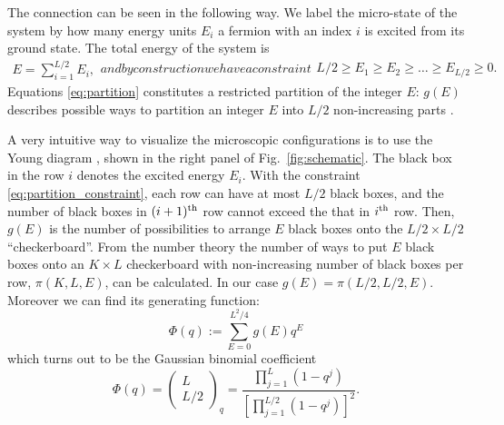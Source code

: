 \documentclass[aps,showpacs,twocolumn,floatfix,prx,superscriptaddress]{revtex4-1}
\begin{document}
The connection can be seen in the following way. We label the micro-state of the system by how many energy units $E_i$ a fermion with an index $i$ is excited from its ground state. The total energy of the system is
\begin{subequations} \label{eq:partition}
\begin{align}
E= \sum_{i=1}^{L/2} E_i,
\end{align}
and by construction we have a constraint 
\begin{align}
L/2 \ge E_1 \ge E_2 \ge \ldots \ge E_{L/2} \ge 0. \label{eq:partition_constraint}
\end{align}
\end{subequations}
Equations \eqref{eq:partition} constitutes a restricted partition of the integer $E$: $g(E)$ describes possible ways to partition an integer $E$ into $L/2$ non-increasing parts \cite{andrews1998theory}.

A very intuitive way to visualize the microscopic configurations is to use the Young diagram \cite{andrews1998theory}, shown in the right panel of Fig.~\ref{fig:schematic}. The black box in the row $i$ denotes the excited energy $E_i$. With the constraint \eqref{eq:partition_constraint}, each row can have at most $L/2$ black boxes, and the number of black boxes in $(i+1)^{\rm th}$ row cannot exceed the that in $i^{\rm th}$ row.  Then, $g(E)$ is the number of possibilities to arrange $E$ black boxes onto the $L/2 \times L/2$ ``checkerboard''. From the number theory \cite{andrews1998theory} the number of ways to put $E$ black boxes onto an $K \times L$ checkerboard with non-increasing number of black boxes per row, $\pi (K,L,E)$, can be calculated. In our case $g(E)=\pi\left(L/2,L/2,E\right)$. Moreover we can find its generating function:
\begin{equation}
\Phi (q) := \sum_{E=0}^{L^2/4} g(E) q^E
\label{eq:generating}
\end{equation}
which turns out to be the Gaussian binomial coefficient
\begin{equation}
\Phi (q) = \left(\begin{array}{c} L \\ L/2 \end{array}\right)_q = \frac{\prod_{j=1}^{L} \left(1-q^j\right)}{\left[\prod_{j=1}^{L/2} \left(1-q^j\right)\right]^2}.
\label{eq:binomial}
\end{equation}
\end{document}

